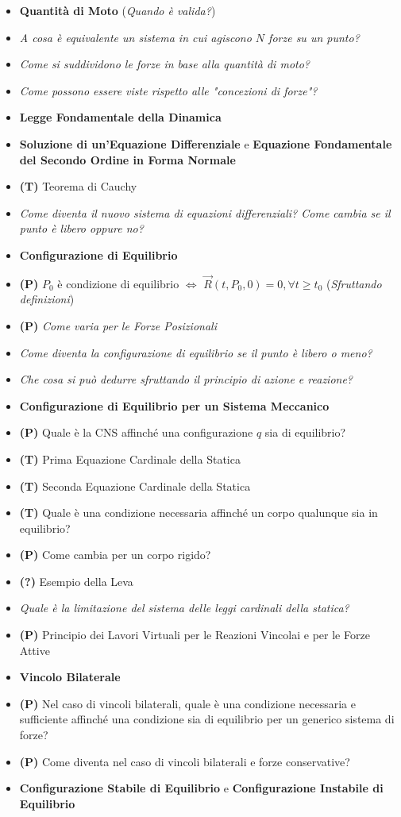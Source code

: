 \documentclass[11pt,a4paper,twoside]{article}
\begin{document}
\begin{itemize}
	\item \textbf{Quantità di Moto} (\textit{Quando è valida?})
	\item \textit{A cosa è equivalente un sistema in cui agiscono $N$ forze su un punto?}
	\item \textit{Come si suddividono le forze in base alla quantità di moto?}
	\item \textit{Come possono essere viste rispetto alle "concezioni di forze"?}
	\item \textbf{Legge Fondamentale della Dinamica}
	\item \textbf{Soluzione di un'Equazione Differenziale} e \textbf{Equazione Fondamentale del Secondo Ordine in Forma Normale}
	\item \textbf{(T)} Teorema di Cauchy
	\item \textit{Come diventa il nuovo sistema di equazioni differenziali? Come cambia se il punto è libero oppure no?}
	\item \textbf{Configurazione di Equilibrio}
	\item \textbf{(P)} $P_0$ è condizione di equilibrio $\Leftrightarrow$ $\vec R(t,P_0,0)=0, \forall t\geq t_0$ (\textit{Sfruttando definizioni})
	\item \textbf{(P)} \textit{Come varia per le Forze Posizionali}
	\item \textit{Come diventa la configurazione di equilibrio se il punto è libero o meno?}
	\item \textit{Che cosa si può dedurre sfruttando il principio di azione e reazione?}
	\item \textbf{Configurazione di Equilibrio per un Sistema Meccanico}
	\item \textbf{(P)} Quale è la CNS affinché una configurazione $q$ sia di equilibrio?
	\item \textbf{(T)} Prima Equazione Cardinale della Statica
	\item \textbf{(T)} Seconda Equazione Cardinale della Statica
	\item \textbf{(T)} Quale è una condizione necessaria affinché un corpo qualunque sia in equilibrio?
	\item \textbf{(P)} Come cambia per un corpo rigido?
	\item \textbf{(?)} Esempio della Leva
	\item \textit{Quale è la limitazione del sistema delle leggi cardinali della statica?}
	\item \textbf{(P)} Principio dei Lavori Virtuali per le Reazioni Vincolai e per le Forze Attive
	\item \textbf{Vincolo Bilaterale}
	\item \textbf{(P)} Nel caso di vincoli bilaterali, quale è una condizione necessaria e sufficiente affinché una condizione sia di equilibrio per un generico sistema di forze?
	\item \textbf{(P)} Come diventa nel caso di vincoli bilaterali e forze conservative?
	\item \textbf{Configurazione Stabile di Equilibrio} e \textbf{Configurazione Instabile di Equilibrio}
\end{itemize}
\end{document}
